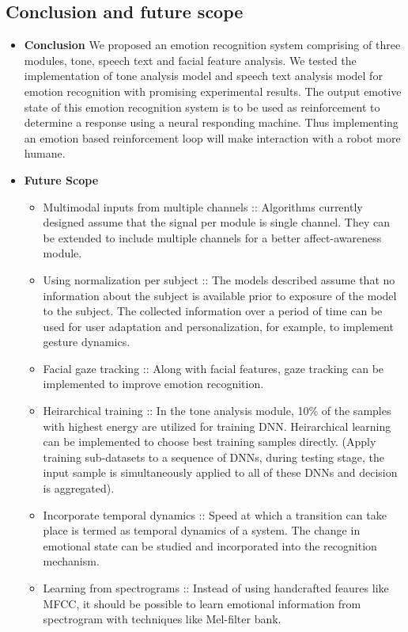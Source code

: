 \documentclass[oneside,a4paper,12pt]{report}
\begin{document}
\begin{normalsize}
 \chapter{Conclusion and future scope}
	\begin{itemize}
		\item \textbf{Conclusion}
		We proposed an emotion recognition system comprising of three modules, tone, speech text and facial feature analysis. We tested the implementation of tone analysis model and speech text analysis model for emotion recognition with promising experimental results. The output emotive state of this emotion recognition system is to be used as reinforcement to determine a response using a neural responding machine. Thus implementing an emotion based reinforcement loop will make interaction with a robot more humane. 
		\item \textbf{Future Scope}
		\begin{itemize}
			\item Multimodal inputs from multiple channels ::
			Algorithms currently designed assume that the signal per module is single channel. They can be extended to include multiple channels for a better affect-awareness module.
			\item Using normalization per subject ::
			The models described assume that no information about the subject is available prior to exposure of the model to the subject. The collected information over a period of time can be used for user adaptation and personalization, for example, to implement gesture dynamics.
			\item Facial gaze tracking ::
			Along with facial features, gaze tracking can be implemented to improve emotion recognition.
			\item Heirarchical training :: 
			In the tone analysis module, 10\% of the samples with highest energy are utilized for training DNN. Heirarchical learning can be implemented to choose best training samples directly. (Apply training sub-datasets to a sequence of DNNs, during testing stage, the input sample is simultaneously applied to all of these DNNs and decision is aggregated).
			\item Incorporate temporal dynamics :: 
			Speed at which a transition can take place is termed as temporal dynamics of a system. The change in emotional state can be studied and incorporated into the recognition mechanism.
			\item Learning from spectrograms :: 
			Instead of using handcrafted feaures like MFCC, it should be possible to learn emotional information from spectrogram with techniques like Mel-filter bank. 
		\end{itemize}
	\end{itemize}
 {}


\end{normalsize}
\end{document}
